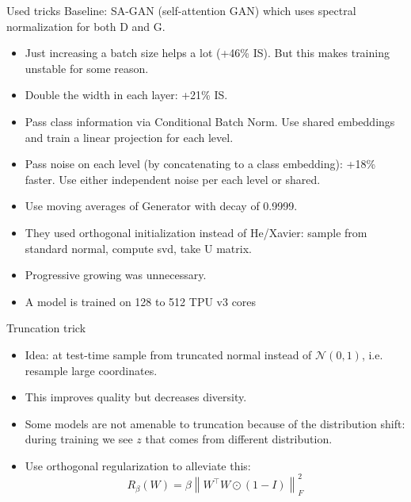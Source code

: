 \documentclass[10pt]{beamer}
\begin{document}
\begin{frame}{Used tricks}
    \pause 
    Baseline: SA-GAN (self-attention GAN) which uses spectral normalization for both D and G.
    \begin{itemize}
        \item \pause Just increasing a batch size helps a lot (+46\% IS). But this makes training unstable for some reason.
        \item \pause Double the width in each layer: +21\% IS.
        \item \pause Pass class information via Conditional Batch Norm. Use shared embeddings and train a linear projection for each level.
        \item \pause Pass noise on each level (by concatenating to a class embedding): +18\% faster. Use either independent noise per each level or shared.
        \item \pause Use moving averages of Generator with decay of 0.9999.
        \item \pause They used orthogonal initialization instead of He/Xavier: sample from standard normal, compute svd, take U matrix.
        \item \pause Progressive growing was unnecessary.
        \item \pause A model is trained on 128 to 512 TPU v3 cores
    \end{itemize}
\end{frame}

\begin{frame}{Truncation trick}
    \pause 
    
    \begin{itemize}
        \item \pause Idea: at test-time sample from truncated normal instead of $\mathcal{N}(0,1)$, i.e. resample large coordinates.
        \item \pause This improves quality but decreases diversity.
        \item \pause Some models are not amenable to truncation because of the distribution shift: during training we see $z$ that comes from different distribution.
        \item \pause Use orthogonal regularization to alleviate this:
        $$
        R_{\beta}(W)=\beta\left\|W^{\top} W \odot(1-I)\right\|_{F}^{2}
        $$
    \end{itemize}
\end{frame}
\end{document}
